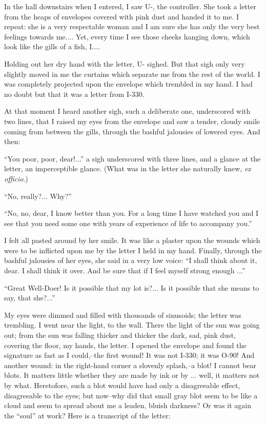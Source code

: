 \documentclass[11pt,openany]{book}
\begin{document}
In the hall downstairs when I entered, I saw U-, the controller. She took a letter from the heaps of envelopes covered with pink dust and handed it to me. I repeat: she is a very respectable woman and I am sure she has only the very best feelings towards me.... Yet, every time I see those cheeks hanging down, which look like the gills of a fish, I....

Holding out her dry hand with the letter, U- sighed. But that sigh only very slightly moved in me the curtains which separate me from the rest of the world. I was completely projected upon the envelope which trembled in my hand. I had no doubt but that it was a letter from I-330.

At that moment I heard another sigh, such a deliberate one, underscored with two lines, that I raised my eyes from the envelope and saw a tender, cloudy smile coming from between the gills, through the bashful jalousies of lowered eyes. And then:

``You poor, poor, dear!...'' a sigh underscored with three lines, and a glance at the letter, an imperceptible glance. (What was in the letter she naturally knew, \emph{ex officio}.)

``No, really?... Why?''

``No, no, dear, I know better than you. For a long time I have watched you and I see that you need some one with years of experience of life to accompany you.''

I felt all pasted around by her smile. It was like a plaster upon the wounds which were to be inflicted upon me by the letter I held in my hand. Finally, through the bashful jalousies of her eyes, she said in a very low voice: ``I shall think about it, dear. I shall think it over. And be sure that if I feel myself strong enough ...''

``Great Well-Doer! Is it possible that my lot is?... Is it possible that she means to say, that she?...''

My eyes were dimmed and filled with thousands of sinusoids; the letter was trembling. I went near the light, to the wall. There the light of the sun was going out; from the sun was falling thicker and thicker the dark, sad, pink dust, covering the floor, my hands, the letter. I opened the envelope and found the signature as fast as I could,--the first wound! It was not I-330; it was O-90! And another wound: in the right-hand corner a slovenly splash,--a blot! I cannot bear blots. It matters little whether they are made by ink or by ... well, it matters not by what. Heretofore, such a blot would have had only a disagreeable effect, disagreeable to the eyes; but now--why did that small gray blot seem to be like a cloud and seem to spread about me a leaden, bluish darkness? Or was it again the ``soul'' at work? Here is a transcript of the letter:
\end{document}
